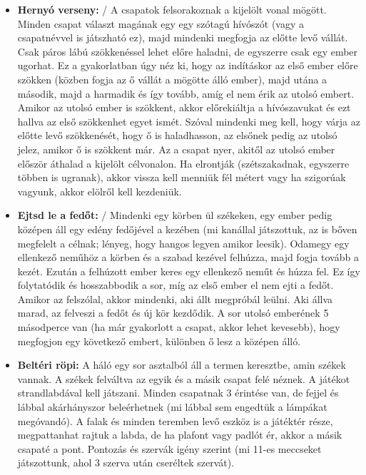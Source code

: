 \documentclass[a4paper, 12pt, twoside, openright]{article}
\begin{document}
\begin{itemize}
\item \textbf{Hernyó verseny:} / A csapatok felsorakoznak a kijelölt vonal mögött. Minden csapat választ magának egy egy szótagú hívószót (vagy a csapatnévvel is játszható ez), majd mindenki megfogja az előtte levő vállát. Csak páros lábú szökkenéssel lehet előre haladni, de egyszerre csak egy ember ugorhat. Ez a gyakorlatban úgy néz ki, hogy az indításkor az első ember előre szökken (közben fogja az ő vállát a mögötte álló ember), majd utána a második, majd a harmadik és így tovább, amíg el nem érik az utolsó embert. Amikor az utolsó ember is szökkent, akkor előrekiáltja a hívószavukat és ezt hallva az első szökkenhet egyet ismét. Szóval mindenki meg kell, hogy várja az előtte levő szökkenését, hogy ő is haladhasson, az elsőnek pedig az utolsó jelez, amikor ő is szökkent már. Az a csapat nyer, akitől az utolsó ember először áthalad a kijelölt célvonalon. Ha elrontják (szétszakadnak, egyszerre többen is ugranak), akkor vissza kell menniük fél métert vagy ha szigorúak vagyunk, akkor elölről kell kezdeniük.

\item \textbf{Ejtsd le a fedőt:} / Mindenki egy körben ül székeken, egy ember pedig középen áll egy edény fedőjével a kezében (mi kanállal játszottuk, az is bőven megfelelt a célnak; lényeg, hogy hangos legyen amikor leesik). Odamegy egy ellenkező neműhöz a körben és a szabad kezével felhúzza, majd fogja tovább a kezét. Ezután a felhúzott ember keres egy ellenkező neműt és húzza fel. Ez így folytatódik és hosszabbodik a sor, míg az első ember el nem ejti a fedőt. Amikor az felszólal, akkor mindenki, aki állt megpróbál leülni. Aki állva marad, az felveszi a fedőt és új kör kezdődik. A sor utolsó emberének 5 másodperce van (ha már gyakorlott a csapat, akkor lehet kevesebb), hogy megfogjon egy következő embert, különben ő lesz a középen álló.

\item \textbf{Beltéri röpi:} A háló egy sor asztalból áll a termen keresztbe, amin székek vannak. A székek felváltva az egyik és a másik csapat felé néznek. A játékot strandlabdával kell játszani. Minden csapatnak 3 érintése van, de fejjel és lábbal akárhányszor beleérhetnek (mi lábbal sem engedtük a lámpákat megóvandó). A falak és minden teremben levő eszköz is a játéktér része, megpattanhat rajtuk a labda, de ha plafont vagy padlót ér, akkor a másik csapaté a pont. Pontozás és szervák igény szerint (mi 11-es meccseket játszottunk, ahol 3 szerva után cseréltek szervát).


\end{itemize}
\end{document}
